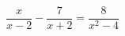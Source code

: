 \begin{ex}[type=equation]
	\begin{condition}
		\( \dfrac{x}{x-2}-\dfrac{7}{x+2}=\dfrac{8}{x^2-4} \)
	\end{condition}
\end{ex}